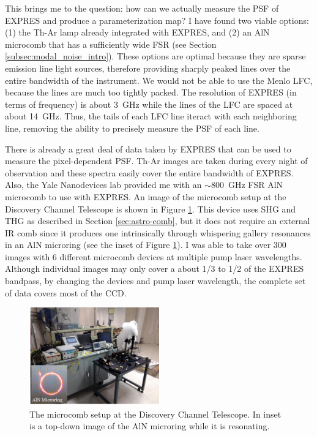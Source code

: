 \documentclass[11pt]{article}
\begin{document}
This brings me to the question: how can we actually measure the PSF of EXPRES and produce a parameterization map? I have found two viable options: (1) the Th-Ar lamp already integrated with EXPRES, and (2) an AlN microcomb that has a sufficiently wide FSR (see Section \ref{subsec:modal_noise_intro}). These options are optimal because they are sparse emission line light sources, therefore providing sharply peaked lines over the entire bandwidth of the instrument. We would not be able to use the Menlo LFC, because the lines are much too tightly packed. The resolution of EXPRES (in terms of frequency) is about \SI{3}{\giga\hertz} while the lines of the LFC are spaced at about \SI{14}{\giga\hertz}. Thus, the tails of each LFC line iteract with each neighboring line, removing the ability to precisely measure the PSF of each line.

There is already a great deal of data taken by EXPRES that can be used to measure the pixel-dependent PSF. Th-Ar images are taken during every night of observation and these spectra easily cover the entire bandwidth of EXPRES. Also, the Yale Nanodevices lab provided me with an $\sim$\SI{800}{\giga\hertz} FSR AlN microcomb to use with EXPRES. An image of the microcomb setup at the Discovery Channel Telescope is shown in Figure \ref{fig:aln_setup}. This device uses SHG and THG as described in Section \ref{sec:astro-comb}, but it does not require an external IR comb since it produces one intrinsically through whispering gallery resonances in an AlN microring (see the inset of Figure \ref{fig:aln_setup}). I was able to take over 300 images with 6 different microcomb devices at multiple pump laser wavelengths. Although individual images may only cover a about 1/3 to 1/2 of the EXPRES bandpass, by changing the devices and pump laser wavelength, the complete set of data covers most of the CCD.

\begin{figure}
    \centering
    \includegraphics[width=0.5\textwidth]{images/aln_setup.png}
    \caption{The microcomb setup at the Discovery Channel Telescope. In inset is a top-down image of the AlN microring while it is resonating.}
    \label{fig:aln_setup}
\end{figure}
\end{document}
